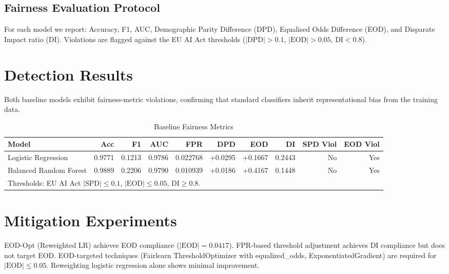 \documentclass[conference]{IEEEtran}
\begin{document}
\subsection{Fairness Evaluation Protocol}

For each model we report: Accuracy, F1, AUC, Demographic Parity Difference (DPD), Equalised Odds Difference (EOD), and Disparate Impact ratio (DI).  Violations are flagged against the EU AI Act thresholds ($|\mathrm{DPD}| > 0.1$, $|\mathrm{EOD}| > 0.05$, $\mathrm{DI} < 0.8$).

\section{Detection Results}
\label{sec:detection}

Both baseline models exhibit fairness-metric violations, confirming that standard classifiers inherit representational bias from the training data.

\begin{table}[!t]
\centering
\caption{Baseline Fairness Metrics}
\label{tab:baseline}
\footnotesize
\begin{tabular}{@{}lrrrrrrrrr@{}}
\toprule
Model & Acc & F1 & AUC & FPR & DPD & EOD & DI & SPD Viol & EOD Viol \\
\midrule
Logistic Regression & 0.9771 & 0.1213 & 0.9786 & 0.022768 & +0.0295 & +0.1667 & 0.2443 & No & Yes \\
Balanced Random Forest & 0.9889 & 0.2206 & 0.9790 & 0.010939 & +0.0186 & +0.4167 & 0.1448 & No & Yes \\
\bottomrule
\multicolumn{10}{l}{\scriptsize Thresholds: EU AI Act $|\mathrm{SPD}| \leq 0.1$, $|\mathrm{EOD}| \leq 0.05$, $\mathrm{DI} \geq 0.8$.}
\end{tabular}
\end{table}

\section{Mitigation Experiments}
\label{sec:mitigation}

EOD-Opt (Reweighted LR) achieves EOD compliance ($|\mathrm{EOD}| = 0.0417$). FPR-based threshold adjustment achieves DI compliance but does not target EOD. EOD-targeted techniques (Fairlearn ThresholdOptimizer with equalized\_odds, ExponentiatedGradient) are required for $|\mathrm{EOD}| \leq 0.05$. Reweighting logistic regression alone shows minimal improvement.
\end{document}
